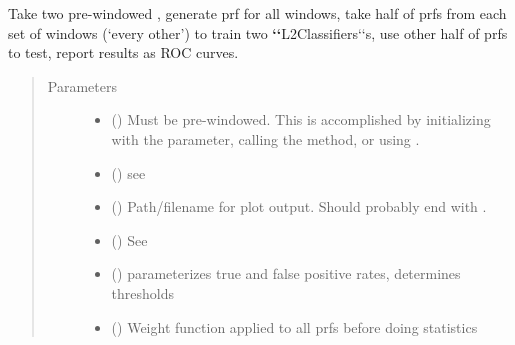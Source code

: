 \documentclass[letterpaper,10pt,openany,oneside,english]{sphinxmanual}
\begin{document}
\begin{fulllineitems}
\label{\detokenize{prfstats:prfstats.plot_rocs}}
Take two pre-windowed , generate prf for all windows, take
half of prfs from each set of windows (‘every other’) to train two
{\color{red}\bfseries{}{}`{}`}L2Classifiers{}`{}`s, use other half of prfs to test, report results as ROC
curves.
\begin{quote}\begin{description}
\item[{Parameters}] \leavevmode\begin{itemize}
\item {} 
 ({\hyperref[\detokenize{signals:signals.Trajectory}]{}}) \textendash{} Must be pre-windowed. This is accomplished by initializing with the
 parameter, calling the  method, or using
.

\item {} 
 ({\hyperref[\detokenize{signals:signals.Trajectory}]{}}) \textendash{} see 

\item {} 
 () \textendash{} Path/filename for plot output. Should probably end with .

\item {} 
 () \textendash{} See {\hyperref[\detokenize{phomology:phomology.build_filtration.build_filtration}]{}}

\item {} 
 () \textendash{} parameterizes true and false positive rates, determines thresholds

\item {} 
 (\sphinxstyleliteralemphasis{, }) \textendash{} 
Weight function applied to all prfs before doing statistics


\end{itemize}
\end{description}
\end{quote}
\end{fulllineitems}
\end{document}
